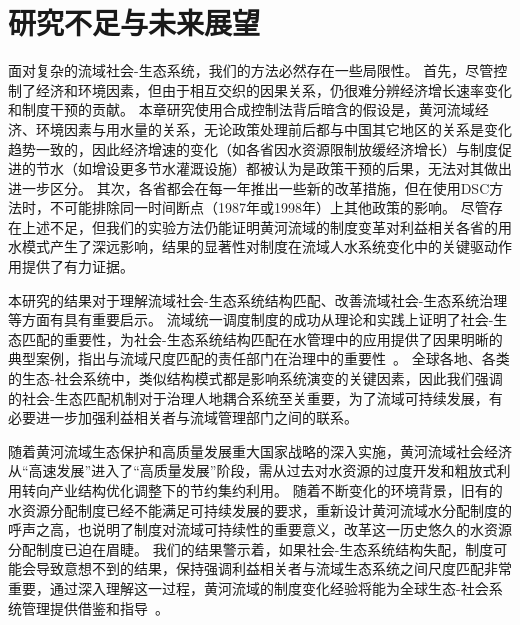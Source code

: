 \section{研究不足与未来展望}
面对复杂的流域社会-生态系统，我们的方法必然存在一些局限性。
首先，尽管控制了经济和环境因素，但由于相互交织的因果关系，仍很难分辨经济增长速率变化和制度干预的贡献。
本章研究使用合成控制法背后暗含的假设是，黄河流域经济、环境因素与用水量的关系，无论政策处理前后都与中国其它地区的关系是变化趋势一致的，因此经济增速的变化（如各省因水资源限制放缓经济增长）与制度促进的节水（如增设更多节水灌溉设施）都被认为是政策干预的后果，无法对其做出进一步区分。
其次，各省都会在每一年推出一些新的改革措施，但在使用DSC方法时，不可能排除同一时间断点（1987年或1998年）上其他政策的影响。
尽管存在上述不足，但我们的实验方法仍能证明黄河流域的制度变革对利益相关各省的用水模式产生了深远影响，结果的显著性对制度在流域人水系统变化中的关键驱动作用提供了有力证据。

本研究的结果对于理解流域社会-生态系统结构匹配、改善流域社会-生态系统治理等方面有具有重要启示。
流域统一调度制度的成功从理论和实践上证明了社会-生态匹配的重要性，为社会-生态系统结构匹配在水管理中的应用提供了因果明晰的典型案例，指出与流域尺度匹配的责任部门在治理中的重要性~\cite{bodin2017b, ostrom2009, reyers2018}。
全球各地、各类的生态-社会系统中，类似结构模式都是影响系统演变的关键因素，因此我们强调的社会-生态匹配机制对于治理人地耦合系统至关重要，为了流域可持续发展，有必要进一步加强利益相关者与流域管理部门之间的联系。

随着黄河流域生态保护和高质量发展重大国家战略的深入实施，黄河流域社会经济从“高速发展”进入了“高质量发展”阶段，需从过去对水资源的过度开发和粗放式利用转向产业结构优化调整下的节约集约利用。
随着不断变化的环境背景，旧有的水资源分配制度已经不能满足可持续发展的要求，重新设计黄河流域水分配制度的呼声之高，也说明了制度对流域可持续性的重要意义，改革这一历史悠久的水资源分配制度已迫在眉睫\cite{wang2019a}。
我们的结果警示着，如果社会-生态系统结构失配，制度可能会导致意想不到的结果，保持强调利益相关者与流域生态系统之间尺度匹配非常重要，通过深入理解这一过程，黄河流域的制度变化经验将能为全球生态-社会系统管理提供借鉴和指导~\cite{hegwood2022, muneepeerakul2017, leslie2015}。
